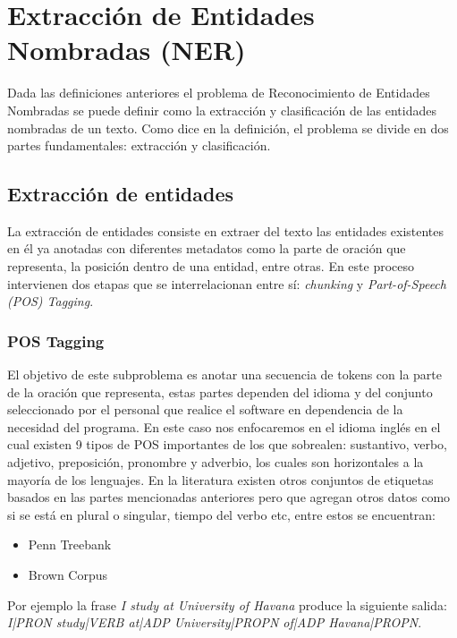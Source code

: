 \documentclass[runningheads]{llncs}
\begin{document}
\section{Extracción de Entidades Nombradas (NER)}

Dada las definiciones anteriores el problema de Reconocimiento de Entidades Nombradas se puede definir como la extracción y clasificación de las entidades nombradas de un texto. Como dice en la definición, el problema se divide en dos partes fundamentales: extracción y clasificación.

\subsection{Extracción de entidades}

La extracción de entidades consiste en extraer del texto las entidades existentes en él ya anotadas con diferentes metadatos como la parte de oración que representa, la posición dentro de una entidad, entre otras. En este proceso intervienen dos etapas que se interrelacionan entre sí: \emph{chunking}\cite{chunking} y \emph{Part-of-Speech (POS) Tagging}\cite{postag}.

\subsubsection{POS Tagging}

El objetivo de este subproblema es anotar una secuencia de tokens con la parte de la oración que representa, estas partes dependen del idioma y del conjunto seleccionado por el personal que realice el software en dependencia de la necesidad del programa. En este caso nos enfocaremos en el idioma inglés en el cual existen 9 tipos de POS importantes de los que sobrealen: sustantivo, verbo, adjetivo, preposición, pronombre y adverbio, los cuales son horizontales a la mayoría de los lenguajes. En la literatura existen otros conjuntos de etiquetas basados en las partes mencionadas anteriores pero que agregan otros datos como si se está en plural o singular, tiempo del verbo etc, entre estos se encuentran:

\begin{itemize}
\item Penn Treebank \cite{pennpostag}
\item Brown Corpus \cite{brownpostag}
\end{itemize}

Por ejemplo la frase \emph{I study at University of Havana} produce la siguiente salida: \emph{I|PRON study|VERB at|ADP University|PROPN of|ADP Havana|PROPN}.
\end{document}
